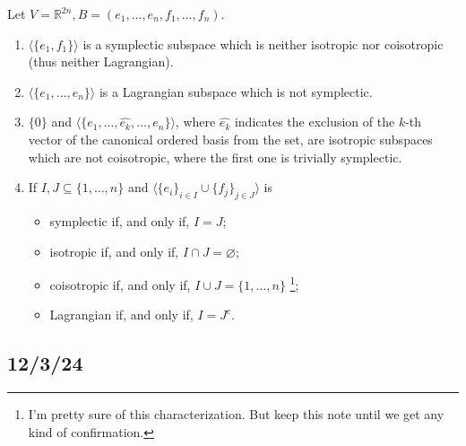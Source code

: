 \begin{Exp}\label{Exp: Symplectic, isotropic, coisotropic and Lagrangian subspaces}
    Let $V=\mathbb{R}^{2n}, B=(e_1,\dots,e_n,f_1,\dots,f_n)$.

    \begin{enumerate}[label=\ExpLbl]

        \item $\langle \{e_1, f_1\} \rangle$ is a symplectic subspace which is neither isotropic nor coisotropic (thus neither Lagrangian).

        \item $\langle \{e_1,\dots,e_n\} \rangle$ is a Lagrangian subspace which is not symplectic.

        \item $\{0\}$ and $\langle \{e_1,\dots,\hat{e_k},\dots,e_n\} \rangle$, where $\hat{e_k}$ indicates the exclusion of the $k$-th vector of the canonical ordered basis from the set, are isotropic subspaces which are not coisotropic, where the first one is trivially symplectic.

        \item If $I,J\subseteq \{1,\dots,n\}$ and $\langle \{e_i\}_{i\in I}\cup\{f_j\}_{j\in J} \rangle$ is
            \begin{itemize}

                \item symplectic if, and only if, $I=J$;

                \item isotropic if, and only if, $I\cap J=\varnothing$;

                \item coisotropic if, and only if, $I \cup J = \{1,\dots,n\}$ \footnote{I'm pretty sure of this characterization. But keep this note until we get any kind of confirmation.};

                \item Lagrangian if, and only if, $I=J^c$.
            \end{itemize}
    \end{enumerate}
\end{Exp}

\subsection*{12/3/24}\label{Sec: 12/3/24}

